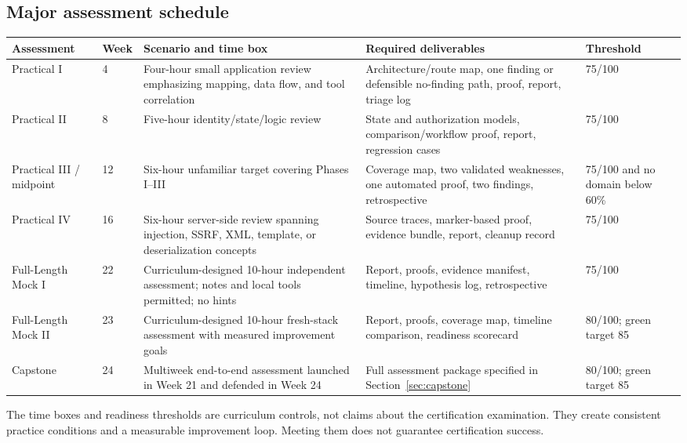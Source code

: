 \documentclass[11pt]{article}
\begin{document}
\subsection{Major assessment schedule}
\small
\begin{longtable}{@{}L{0.14\textwidth}L{0.08\textwidth}L{0.25\textwidth}L{0.27\textwidth}L{0.14\textwidth}@{}}
\toprule
\textbf{Assessment} & \textbf{Week} & \textbf{Scenario and time box} & \textbf{Required deliverables} & \textbf{Threshold} \\
\midrule
\endhead
Practical I & 4 & Four-hour small application review emphasizing mapping, data flow, and tool correlation & Architecture/route map, one finding or defensible no-finding path, proof, report, triage log & 75/100 \\
Practical II & 8 & Five-hour identity/state/logic review & State and authorization models, comparison/workflow proof, report, regression cases & 75/100 \\
Practical III / midpoint & 12 & Six-hour unfamiliar target covering Phases I--III & Coverage map, two validated weaknesses, one automated proof, two findings, retrospective & 75/100 and no domain below 60\% \\
Practical IV & 16 & Six-hour server-side review spanning injection, SSRF, XML, template, or deserialization concepts & Source traces, marker-based proof, evidence bundle, report, cleanup record & 75/100 \\
Full-Length Mock I & 22 & Curriculum-designed 10-hour independent assessment; notes and local tools permitted; no hints & Report, proofs, evidence manifest, timeline, hypothesis log, retrospective & 75/100 \\
Full-Length Mock II & 23 & Curriculum-designed 10-hour fresh-stack assessment with measured improvement goals & Report, proofs, coverage map, timeline comparison, readiness scorecard & 80/100; green target 85 \\
Capstone & 24 & Multiweek end-to-end assessment launched in Week 21 and defended in Week 24 & Full assessment package specified in Section~\ref{sec:capstone} & 80/100; green target 85 \\
\bottomrule
\end{longtable}
\normalsize

\begin{insightbox}
The time boxes and readiness thresholds are curriculum controls, not claims about
the certification examination. They create consistent practice conditions and a
measurable improvement loop. Meeting them does not guarantee certification
success.
\end{insightbox}
\end{document}
